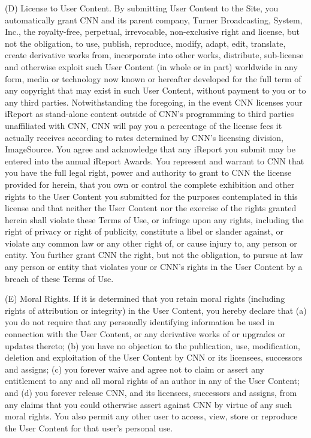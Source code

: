 (D) License to User Content. By submitting User Content to the Site, you
automatically grant CNN and its parent company, Turner Broadcasting,
System, Inc., the royalty-free, perpetual, irrevocable, non-exclusive
right and license, but not the obligation, to use, publish, reproduce,
modify, adapt, edit, translate, create derivative works from,
incorporate into other works, distribute, sub-license and otherwise
exploit such User Content (in whole or in part) worldwide in any form,
media or technology now known or hereafter developed for the full term
of any copyright that may exist in such User Content, without payment to
you or to any third parties. Notwithstanding the foregoing, in the event
CNN licenses your iReport as stand-alone content outside of CNN's
programming to third parties unaffiliated with CNN, CNN will pay you a
percentage of the license fees it actually receives according to rates
determined by CNN's licensing division, ImageSource. You agree and
acknowledge that any iReport you submit may be entered into the annual
iReport Awards. You represent and warrant to CNN that you have the full
legal right, power and authority to grant to CNN the license provided
for herein, that you own or control the complete exhibition and other
rights to the User Content you submitted for the purposes contemplated
in this license and that neither the User Content nor the exercise of
the rights granted herein shall violate these Terms of Use, or infringe
upon any rights, including the right of privacy or right of publicity,
constitute a libel or slander against, or violate any common law or any
other right of, or cause injury to, any person or entity. You further
grant CNN the right, but not the obligation, to pursue at law any person
or entity that violates your or CNN's rights in the User Content by a
breach of these Terms of Use.

(E) Moral Rights. If it is determined that you retain moral rights
(including rights of attribution or integrity) in the User Content, you
hereby declare that (a) you do not require that any personally
identifying information be used in connection with the User Content, or
any derivative works of or upgrades or updates thereto; (b) you have no
objection to the publication, use, modification, deletion and
exploitation of the User Content by CNN or its licensees, successors and
assigns; (c) you forever waive and agree not to claim or assert any
entitlement to any and all moral rights of an author in any of the User
Content; and (d) you forever release CNN, and its licensees, successors
and assigns, from any claims that you could otherwise assert against CNN
by virtue of any such moral rights. You also permit any other user to
access, view, store or reproduce the User Content for that user's
personal use.

